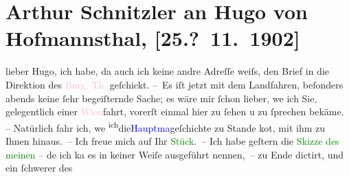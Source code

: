 

               \section[Arthur Schnitzler an Hugo von Hofmannsthal, {[}25.? 11. 1902{]}]{ Arthur Schnitzler an Hugo von Hofmannsthal, {[}25.? 11. 1902{]}}\nopagebreak{}\rehead{ }\normalsize\beginnumbering{} \toendnotes[C]{\smallbreak\pagebreak[2]} 
\toendnotes[C]{\smallbreak}\pstart
           \noindent{}{\pb}lieber Hugo, ich habe, da auch ich keine andre Adreſſe weiſs,
                    den Brief in die Direktion des \textcolor{pink}{Burg. Th.}{}\ledrightnote{\textcolor{pink}{Burgtheater}}
                    geſchickt.\pend
           \pstart
           – Es iſt jetzt mit dem Landfahren, beſonders abends  keine ſehr begeiſternde Sache; es wäre mir ſchon lieber,
                        we{\geminationn} ich Sie, gelegentlich einer \textcolor{pink}{Wien}{}\ledrightnote{\textcolor{pink}{Wien}}fahrt, vorerſt einmal hier zu ſehen u zu ſprechen
                    bekäme. – Natürlich fahr ich, we{\geminationn}{ }\substVorne{}\textsuperscript{ich}\substDazwischen{}die\substHinten{}{ }\textcolor{blue}{Hauptma{\geminationn}}{}\ledrightnote{\textcolor{blue}{Gerhart Hauptmann}}geſchichte zu Stande ko{\geminationm}t, mit ihm zu Ihnen
                        {\pb}hinaus. –\pend
           \pstart
           Ich freue mich auf Ihr \textcolor{green}{Stück}{}. – Ich habe geſtern die \textcolor{green}{Skizze des meinen}{} – de{\geminationn}
                    ich ka{\geminationn} es in keiner Weiſe ausgeführt nennen, – zu
                    Ende dictirt, und ein ſchwerer \label{K_L01252_1v}\label{K_L01252_1h} des
